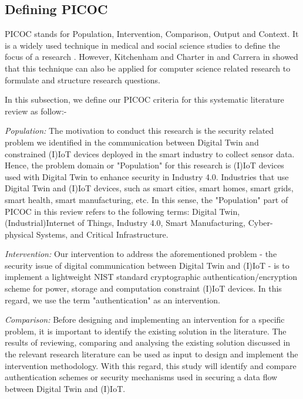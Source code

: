 
\subsection{Defining PICOC}
PICOC stands for Population, Intervention, Comparison, Output and Context. It is a widely used technique in medical and social science studies to define the focus of a research \cite{carrera-rivera_how-conduct_2022}. However, Kitchenham and Charter  in \cite{carrera-rivera_how-conduct_2022} and Carrera in \cite{kitchenham_guidelines_2007} showed that this technique can also be applied for computer science related research to formulate and structure research questions. 

In this subsection, we define our PICOC criteria for this systematic literature review as follow:-

\textit{Population:} The motivation to conduct this research is the security related problem we identified in the communication between Digital Twin and constrained  (I)IoT devices deployed in the smart industry to collect sensor data. Hence, the problem domain or "Population" for this research is (I)IoT devices used with Digital Twin to enhance security in Industry 4.0. Industries that use Digital Twin and (I)IoT devices, such as smart cities, smart homes, smart grids, smart health, smart manufacturing, etc. In this sense, the "Population" part of PICOC in this review refers to the following terms: Digital Twin, (Industrial)Internet of Things, Industry 4.0, Smart Manufacturing, Cyber-physical Systems, and Critical Infrastructure. 

\textit{Intervention:} Our intervention to address the aforementioned problem - the security issue of digital communication between Digital Twin and (I)IoT - is to implement a lightweight NIST standard cryptographic authentication/encryption scheme for power, storage and computation constraint (I)IoT devices. In this regard, we use the term "authentication" as an intervention.

\textit{Comparison:} Before designing and implementing an intervention for a specific problem, it is important to identify the existing solution in the literature. The results of reviewing, comparing and analysing the existing solution discussed in the relevant research literature can be used as input to design and implement the intervention methodology. With this regard, this study will identify and compare authentication schemes or security mechanisms used in securing a data flow between Digital Twin and (I)IoT. 

